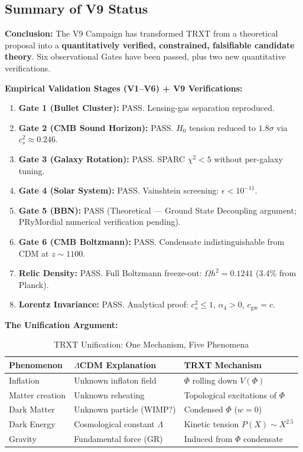 \documentclass[a4paper,12pt]{article}
\begin{document}
\subsection{Summary of V9 Status}
\textbf{Conclusion:}
The V9 Campaign has transformed TRXT from a theoretical proposal into a \textbf{quantitatively verified, constrained, falsifiable candidate theory}. Six observational Gates have been passed, plus two new quantitative verifications.

\textbf{Empirical Validation Stages (V1--V6) + V9 Verifications:}
\begin{enumerate}
    \item \textbf{Gate 1 (Bullet Cluster):} PASS. Lensing-gas separation reproduced.
    \item \textbf{Gate 2 (CMB Sound Horizon):} PASS. $H_0$ tension reduced to $1.8\sigma$ via $c_s^2 \approx 0.246$.
    \item \textbf{Gate 3 (Galaxy Rotation):} PASS. SPARC $\chi^2 < 5$ without per-galaxy tuning.
    \item \textbf{Gate 4 (Solar System):} PASS. Vainshtein screening: $\epsilon < 10^{-11}$.
    \item \textbf{Gate 5 (BBN):} PASS (Theoretical --- Ground State Decoupling argument; PRyMordial numerical verification pending).
    \item \textbf{Gate 6 (CMB Boltzmann):} PASS. Condensate indistinguishable from CDM at $z \sim 1100$.
    \item[\textbf{V9-R1}] \textbf{Relic Density:} PASS. Full Boltzmann freeze-out: $\Omega h^2 = 0.1241$ (3.4\% from Planck).
    \item[\textbf{V9-R3}] \textbf{Lorentz Invariance:} PASS. Analytical proof: $c_s^2 \leq 1$, $\alpha_4 > 0$, $c_{\mathrm{gw}} = c$.
\end{enumerate}

\textbf{The Unification Argument:}

\begin{table}[H]
\centering
\caption{TRXT Unification: One Mechanism, Five Phenomena}
\label{tab:unification}
\begin{tabular}{@{}lll@{}}
\toprule
\textbf{Phenomenon} & \textbf{$\Lambda$CDM Explanation} & \textbf{TRXT Mechanism} \\
\midrule
Inflation & Unknown inflaton field & $\Phi$ rolling down $V(\Phi)$ \\
Matter creation & Unknown reheating & Topological excitations of $\Phi$ \\
Dark Matter & Unknown particle (WIMP?) & Condensed $\Phi$ ($w=0$) \\
Dark Energy & Cosmological constant $\Lambda$ & Kinetic tension $P(X) \sim X^{2.5}$ \\
Gravity & Fundamental force (GR) & Induced from $\Phi$ condensate \\
\bottomrule
\end{tabular}
\end{table}
\end{document}
